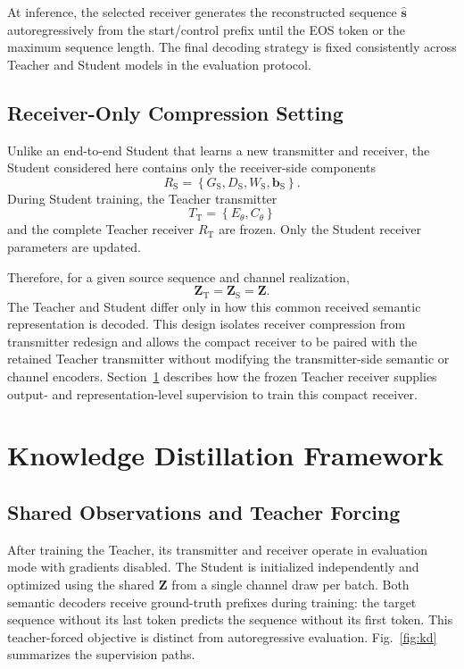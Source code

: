 \documentclass[conference]{IEEEtran}
\begin{document}
At inference, the selected receiver generates the reconstructed sequence $\widehat{\mathbf{s}}$ autoregressively from the start/control prefix until the EOS token or the maximum sequence length. The final decoding strategy is fixed consistently across Teacher and Student models in the evaluation protocol.

\subsection{Receiver-Only Compression Setting}
Unlike an end-to-end Student that learns a new transmitter and receiver, the Student considered here contains only the receiver-side components
\begin{equation}
    R_{\mathrm{S}}
    =\left\{G_{\mathrm{S}},D_{\mathrm{S}},W_{\mathrm{S}},\mathbf{b}_{\mathrm{S}}\right\}.
\end{equation}
During Student training, the Teacher transmitter
\begin{equation}
    T_{\mathrm{T}}
    =\left\{E_{\theta},C_{\theta}\right\}
\end{equation}
and the complete Teacher receiver $R_{\mathrm{T}}$ are frozen. Only the Student receiver parameters are updated.

Therefore, for a given source sequence and channel realization,
\begin{equation}
    \mathbf{Z}_{\mathrm{T}}
    =
    \mathbf{Z}_{\mathrm{S}}
    =
    \mathbf{Z}.
\end{equation}
The Teacher and Student differ only in how this common received semantic representation is decoded. This design isolates receiver compression from transmitter redesign and allows the compact receiver to be paired with the retained Teacher transmitter without modifying the transmitter-side semantic or channel encoders. Section~\ref{sec:kd} describes how the frozen Teacher receiver supplies output- and representation-level supervision to train this compact receiver.

\section{Knowledge Distillation Framework}
\label{sec:kd}
\subsection{Shared Observations and Teacher Forcing}
After training the Teacher, its transmitter and receiver operate in evaluation mode with gradients disabled. The Student is initialized independently and optimized using the shared $\mathbf{Z}$ from a single channel draw per batch. Both semantic decoders receive ground-truth prefixes during training: the target sequence without its last token predicts the sequence without its first token. This teacher-forced objective is distinct from autoregressive evaluation. Fig.~\ref{fig:kd} summarizes the supervision paths.
\end{document}
